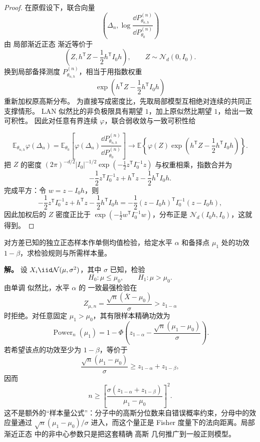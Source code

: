 \begin{proof}
在原假设下，联合向量
\[
 \left(
 \Delta_n,
 \log\frac{\dd P_{\theta_{n,h}}^{(n)}}
 {\dd P_{\theta_0}^{(n)}}
 \right)
\]
由 局部渐近正态 渐近等价于
\[
 \left(
 Z,
 h^{\mathsf T}Z-\frac12h^{\mathsf T}I_0h
 \right),
 \qquad
 Z\sim\mathcal N_d(0,I_0).
\]
换到局部备择测度 $P_{\theta_{n,h}}^{(n)}$，相当于用指数权重
\[
 \exp\!\left(
 h^{\mathsf T}Z-\frac12h^{\mathsf T}I_0h
 \right)
\]
重新加权原高斯分布。
为直接写成密度比，先取局部模型互相绝对连续的共同正支撑情形。
LAN 似然比的非负极限具有期望 $1$，加上原似然比期望 $1$，给出一致可积性。
因此对任意有界连续 $\varphi$，联合弱收敛与一致可积性给

\[
\mathbb E_{\theta_{n,h}}\varphi(\Delta_n)
=\mathbb E_{\theta_0}\!\left[
\varphi(\Delta_n)\frac{\dd P_{\theta_{n,h}}^{(n)}}{\dd P_{\theta_0}^{(n)}}
\right]
\longrightarrow\mathbb E\!\left\{
\varphi(Z)\exp\!\left(h^{\mathsf T}Z-\frac12h^{\mathsf T}I_0h\right)
\right\}.
\]
把 $Z$ 的密度 $(2\pi)^{-d/2}|I_0|^{-1/2}\exp(-\frac12z^{\mathsf T}I_0^{-1}z)$ 与权重相乘，指数合并为
\[
 -\frac12z^{\mathsf T}I_0^{-1}z
 +h^{\mathsf T}z
 -\frac12h^{\mathsf T}I_0h.
\]
完成平方：令 $w=z-I_0h$，则
\[
 -\frac12z^{\mathsf T}I_0^{-1}z
 +h^{\mathsf T}z
 -\frac12h^{\mathsf T}I_0h
 =-\frac12(z-I_0h)^{\mathsf T}
 I_0^{-1}(z-I_0h),
\]
因此加权后的 $Z$ 密度正比于 $\exp(-\frac12w^{\mathsf T}I_0^{-1}w)$，分布正是 $\mathcal N_d(I_0h,I_0)$，这就得到。
\end{proof}


\begin{exbox}[正态均值设计把功效写成标准化法向距离]
对方差已知的独立正态样本作单侧均值检验，给定水平 $\alpha$ 和备择点 $\mu_1$ 处的功效 $1-\beta$，求检验规则与所需样本量。

\textbf{解。} 设 $X_i\iid\mathcal N(\mu,\sigma^2)$，其中 $\sigma$ 已知，检验
\[
 H_0:\mu\le\mu_0,
 \qquad
 H_1:\mu>\mu_0.
\]
由单调 似然比，水平 $\alpha$ 的 一致最强检验在
\[
 Z_{\mu,n}=\frac{\sqrt n(\overline X-\mu_0)}{\sigma}
 >z_{1-\alpha}
\]
时拒绝。对任意固定 $\mu_1>\mu_0$，其有限样本精确功效为
\[
 \operatorname{Power}_n(\mu_1)
 =1-\Phi\!\left(
 z_{1-\alpha}
 -\frac{\sqrt n(\mu_1-\mu_0)}{\sigma}
 \right).
\]
若希望该点的功效至少为 $1-\beta$，等价于
\[
 \frac{\sqrt n(\mu_1-\mu_0)}{\sigma}
 \ge z_{1-\alpha}+z_{1-\beta},
\]
因而
\[
 n\ge
 \left[
 \frac{\sigma(z_{1-\alpha}+z_{1-\beta})}
 {\mu_1-\mu_0}
 \right]^2.
\]
这不是额外的“样本量公式”：分子中的高斯分位数来自错误概率约束，分母中的效应量通过 $\sqrt n(\mu_1-\mu_0)/\sigma$ 进入，而这个量正是 Fisher 度量下的法向距离。局部渐近正态 中的非中心参数只是把这套精确 高斯 几何推广到一般正则模型。
\end{exbox}

